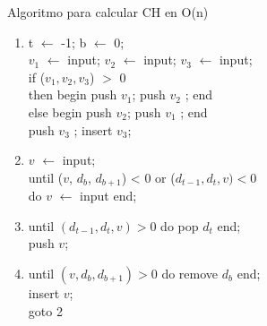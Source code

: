 \documentclass[aspectratio=169,xcolor=dvipsnames, t]{beamer}
\begin{document}
\begin{frame}{}
\begin{columns}
\begin{column}{0.45\textwidth}
\begin{figure}
        \end{figure}
    \end{column}
    \end{columns}
\end{frame}


\begin{frame}{Algoritmo para calcular CH en O(n)}
    \begin{center}
        \begin{enumerate}
        \footnotesize
            \item t $\leftarrow$ -1; b $\leftarrow$ 0;\\
                $v_{1}$ $\leftarrow$ input; $v_{2}$ $\leftarrow$ input; $v_{3}$ $\leftarrow$ input;\\
                 if ($v_{1}, v_{2}, v_{3}$) $>$ 0\\
                \hspace*{0.5cm} then begin push $v_{1}$; push $v_{2}$ ; end \\
                \hspace*{0.5cm} else begin push $v_{2}$; push $v_{1}$ ; end \\
                push $v_{3}$ ; insert $v_{3}$; 
            \item $v$ $\leftarrow$ input;\\
                until ($v$, $d_{b}$, $d_{b+1}$) < 0 or ($d_{t-1}, d_{t}, v) < 0$ \\
                \hspace*{0.5cm} do $v$ $\leftarrow$ input end;  
            \item until $(d_{t-1}, d_{t}, v) > 0$ do pop $d_{t}$ end;\\
                push $v$;
            \item until $(v, d_{b}, d_{b+1}) > 0$ do remove $d_{b}$ end;\\ 
                insert $v$; \\
                goto 2\\
        \end{enumerate}
    \end{center}
\end{frame}


\end{document}
